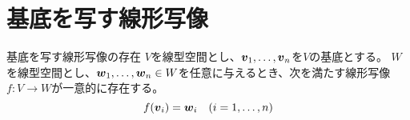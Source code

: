 \documentclass[../../../topic_linear-algebra]{subfiles}
\begin{document}
\sectionline
\section{基底を写す線形写像}

\begin{theorem*}{基底を写す線形写像の存在}
  $V$を線型空間とし、$\vb*{v}_1, \ldots, \vb*{v}_n$を$V$の基底とする。
  $W$を線型空間とし、$\vb*{w}_1, \ldots, \vb*{w}_n \in W$を任意に与えるとき、次を満たす線形写像$f\colon V \to W$が一意的に存在する。
  \begin{equation*}
    f(\vb*{v}_i) = \vb*{w}_i \quad (i = 1, \ldots, n)
  \end{equation*}
\end{theorem*}
\end{document}
